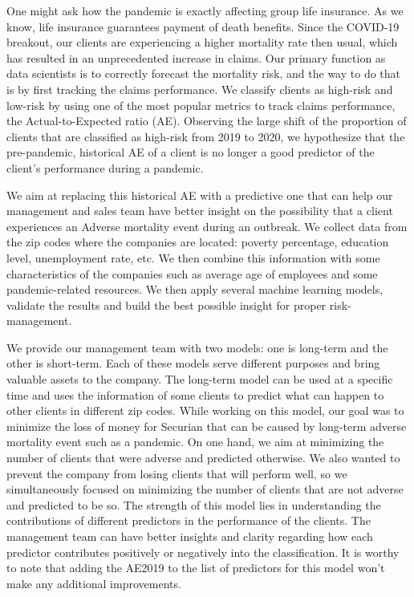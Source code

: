 \documentclass[
]{article}
\begin{document}
One might ask how the pandemic is exactly affecting group life
insurance. As we know, life insurance guarantees payment of death
benefits. Since the COVID-19 breakout, our clients are experiencing a
higher mortality rate then usual, which has resulted in an unprecedented
increase in claims. Our primary function as data scientists is to
correctly forecast the mortality risk, and the way to do that is by
first tracking the claims performance. We classify clients as high-risk
and low-risk by using one of the most popular metrics to track claims
performance, the Actual-to-Expected ratio (AE). Observing the large
shift of the proportion of clients that are classified as high-risk from
2019 to 2020, we hypothesize that the pre-pandemic, historical AE of a
client is no longer a good predictor of the client's performance during
a pandemic.

We aim at replacing this historical AE with a predictive one that can
help our management and sales team have better insight on the
possibility that a client experiences an Adverse mortality event during
an outbreak. We collect data from the zip codes where the companies are
located: poverty percentage, education level, unemployment rate, etc. We
then combine this information with some characteristics of the companies
such as average age of employees and some pandemic-related resources. We
then apply several machine learning models, validate the results and
build the best possible insight for proper risk-management.

We provide our management team with two models: one is long-term and the
other is short-term. Each of these models serve different purposes and
bring valuable assets to the company. The long-term model can be used at
a specific time and uses the information of some clients to predict what
can happen to other clients in different zip codes. While working on
this model, our goal was to minimize the loss of money for Securian that
can be caused by long-term adverse mortality event such as a pandemic.
On one hand, we aim at minimizing the number of clients that were
adverse and predicted otherwise. We also wanted to prevent the company
from losing clients that will perform well, so we simultaneously focused
on minimizing the number of clients that are not adverse and predicted
to be so. The strength of this model lies in understanding the
contributions of different predictors in the performance of the clients.
The management team can have better insights and clarity regarding how
each predictor contributes positively or negatively into the
classification. It is worthy to note that adding the AE2019 to the list
of predictors for this model won't make any additional improvements.
\end{document}
